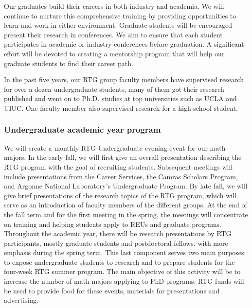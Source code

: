\documentclass[11pt]{article}
\begin{document}
Our graduates build their careers in both industry and academia. We will continue to nurture this comprehensive training by providing opportunities to learn and work in either environment. Graduate students will be encouraged present their research in conferences. We aim to ensure that each student participates in academic or industry conferences before graduation. A significant effort 
will be devoted to creating a mentorship program that will help our graduate students to find their career path.

In the past five years, our RTG group faculty members have
supervised research for over a dozen undergraduate students, many of them got their research published and went on to Ph.D. studies at top universities such as    UCLA and UIUC.   One faculty member also supervised research for a high school student.  


\subsubsection*{Undergraduate  academic year program  }
We will create a monthly RTG-Undergraduate evening event for our   math majors. In the early fall,
we will first give an overall presentation describing the RTG program with the goal of recruiting students.
Subsequent meetings will include presentations from the   Career  Services, the Camras Scholars
Program, and    Argonne National Laboratory's Undergraduate Program. By late fall, we will give brief presentations of the
research topics of the RTG program, which will serve as an introduction of faculty members of the different
groups. At the end of the fall term and for the first meeting in the spring, the meetings will concentrate on
training and helping students apply to REUs and graduate programs. Throughout the academic year, there
will be research presentations by RTG participants, mostly graduate students and postdoctoral fellows, with
more emphasis during the spring term. This last component serves two main purposes: to expose undergraduate
students to research and to prepare students for the four-week RTG summer program. The main
objective of this activity will be to increase the number of  math majors applying to PhD programs.
RTG funds will be used to provide food for these events, materials for presentations and advertising.
\end{document}
